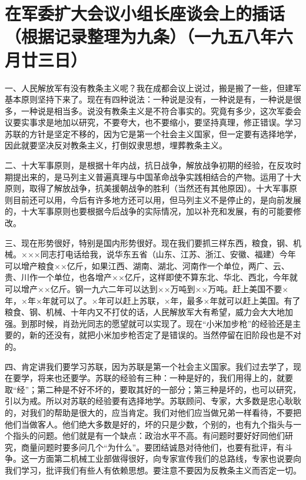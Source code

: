 \section[在军委扩大会议小组长座谈会上的插话（根据记录整理为九条）（一九五八年六月廿三日）]{在军委扩大会议小组长座谈会上的插话（根据记录整理为九条）（一九五八年六月廿三日）}


一、人民解放军有没有教条主义呢？我在成都会议上说过，搬是搬了一些，但建军基本原则坚持下来了。现在有四种说法：一种说是没有，一种说是有，一种说是很多，一种说是相当多。说没有教条主义是不符合事实的。究竟有多少，这次军委会议要实事求是地加以研究，不要夸大，也不要缩小，要坚持真理，修正错误。学习苏联的方针是坚定不移的，因为它是第一个社会主义国家，但一定要有选择地学，因此就要坚决反对教条主义，打倒奴隶思想，埋葬教条主义。

二、十大军事原则，是根据十年内战，抗日战争，解放战争初期的经验，在反攻时期提出来的，是马列主义普遍真理与中国革命战争实践相结合的产物。运用了十大原则，取得了解放战争，抗美援朝战争的胜利（当然还有其他原因）。十大军事原则目前还可以用，今后有许多地方还可以用，但马列主义不是停止的，是向前发展的，十大军事原则也要根据今后战争的实际情况，加以补充和发展，有的可能要修改。

三、现在形势很好，特别是国内形势很好。现在我们要抓三样东西，粮食，钢、机械。×××同志打电话给我，说华东五省（山东、江苏、浙江、安徽、福建）今年可以增产粮食××亿斤，如果江西、湖南、湖北、河南作一个单位，两广、云、贵、川作一个单位，也各增产××亿斤，这样即使不算东北、华北、西北，今年就可以增产××亿斤。钢一九六二年可以达到××万吨到××万吨。赶上美国不要×年，×年×年就可以了。×年可以赶上苏联，×年，最多×年就可以赶上美国。有了粮食、钢、机械、十年内又不打仗的话，人民解放军大有希望，威力会大大地加强。到那时候，肖劲光同志的愿望就可以实现了。现在“小米加步枪”的经验还是主要的，新的还没有，就把小米加步枪否定了是错误的。当然停留在旧阶段也是不对的。

四、肯定讲我们要学习苏联，因为苏联是第一个社会主义国家。我们过去学了，现在要学，将来也还要学。苏联的经验有三种：一种是好的，我们用得上的，就要取“经”；第二种是不好不坏的，要取其好的一部分；第三种是坏的，也可以研究，引以为戒。所以对苏联的经验要有选择地学。苏联顾问、专家，大多数是忠心耿耿的，对我们的帮助是很大的，应当肯定。我们对他们应当做兄弟一样看待，不要把他们当做客人。他们绝大多数是好的，坏的只是少数，个别的，也有九个指头与一个指头的问题。他们就是有一个缺点：政治水平不高。有问题时要好好同他们研究，商量问题时要多问几个“为什么”。要团结诚恳对待他们，也要有批评，有斗争。这一方面第二机械工业部做得很好，向专家宣传我们的总路线，专家也说要向我们学习，批评我们有些人有依赖思想。要注意不要因为反教条主义而否定一切。


